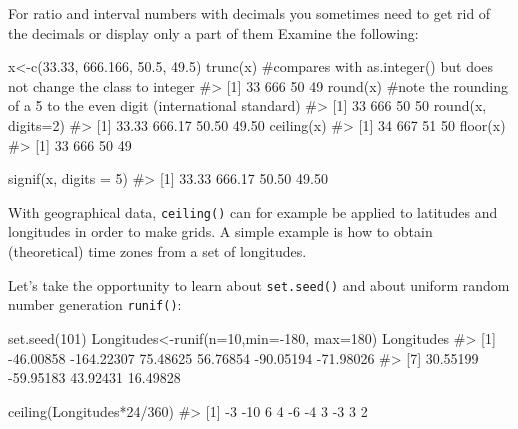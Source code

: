 \documentclass[
  letterpaper,
  DIV=11,
  numbers=noendperiod]{scrreprt}
\newenvironment{Shaded}{\begin{snugshade}}{\end{snugshade}}
\newcommand{\AttributeTok}[1]{\textcolor[rgb]{0.40,0.45,0.13}{#1}}
\newcommand{\CommentTok}[1]{\textcolor[rgb]{0.37,0.37,0.37}{#1}}
\newcommand{\DecValTok}[1]{\textcolor[rgb]{0.68,0.00,0.00}{#1}}
\newcommand{\FloatTok}[1]{\textcolor[rgb]{0.68,0.00,0.00}{#1}}
\newcommand{\FunctionTok}[1]{\textcolor[rgb]{0.28,0.35,0.67}{#1}}
\newcommand{\NormalTok}[1]{\textcolor[rgb]{0.00,0.23,0.31}{#1}}
\newcommand{\OtherTok}[1]{\textcolor[rgb]{0.00,0.23,0.31}{#1}}
\newcommand{\SpecialCharTok}[1]{\textcolor[rgb]{0.37,0.37,0.37}{#1}}
\begin{document}
For ratio and interval numbers with decimals you sometimes need to get
rid of the decimals or display only a part of them Examine the
following:

\begin{Shaded}
\begin{Highlighting}[]
\NormalTok{x}\OtherTok{\textless{}{-}}\FunctionTok{c}\NormalTok{(}\FloatTok{33.33}\NormalTok{, }\FloatTok{666.166}\NormalTok{, }\FloatTok{50.5}\NormalTok{, }\FloatTok{49.5}\NormalTok{)}
\FunctionTok{trunc}\NormalTok{(x) }\CommentTok{\#compares with as.integer() but does not change the class to integer}
\CommentTok{\#\textgreater{} [1]  33 666  50  49}
\FunctionTok{round}\NormalTok{(x) }\CommentTok{\#note the rounding of a 5 to the even digit (international standard) }
\CommentTok{\#\textgreater{} [1]  33 666  50  50}
\FunctionTok{round}\NormalTok{(x, }\AttributeTok{digits=}\DecValTok{2}\NormalTok{)}
\CommentTok{\#\textgreater{} [1]  33.33 666.17  50.50  49.50}
\FunctionTok{ceiling}\NormalTok{(x)}
\CommentTok{\#\textgreater{} [1]  34 667  51  50}
\FunctionTok{floor}\NormalTok{(x)}
\CommentTok{\#\textgreater{} [1]  33 666  50  49}

\FunctionTok{signif}\NormalTok{(x, }\AttributeTok{digits =} \DecValTok{5}\NormalTok{)}
\CommentTok{\#\textgreater{} [1]  33.33 666.17  50.50  49.50}
\end{Highlighting}
\end{Shaded}

With geographical data, \texttt{ceiling()} can for example be applied to
latitudes and longitudes in order to make grids. A simple example is how
to obtain (theoretical) time zones from a set of longitudes.

Let's take the opportunity to learn about \texttt{set.seed()} and about
uniform random number generation \texttt{runif()}:

\begin{Shaded}
\begin{Highlighting}[]
\FunctionTok{set.seed}\NormalTok{(}\DecValTok{101}\NormalTok{)}
\NormalTok{Longitudes}\OtherTok{\textless{}{-}}\FunctionTok{runif}\NormalTok{(}\AttributeTok{n=}\DecValTok{10}\NormalTok{,}\AttributeTok{min=}\SpecialCharTok{{-}}\DecValTok{180}\NormalTok{, }\AttributeTok{max=}\DecValTok{180}\NormalTok{)}
\NormalTok{Longitudes}
\CommentTok{\#\textgreater{}  [1]  {-}46.00858 {-}164.22307   75.48625   56.76854  {-}90.05194  {-}71.98026}
\CommentTok{\#\textgreater{}  [7]   30.55199  {-}59.95183   43.92431   16.49828}

\FunctionTok{ceiling}\NormalTok{(Longitudes}\SpecialCharTok{*}\DecValTok{24}\SpecialCharTok{/}\DecValTok{360}\NormalTok{)}
\CommentTok{\#\textgreater{}  [1]  {-}3 {-}10   6   4  {-}6  {-}4   3  {-}3   3   2}
\end{Highlighting}
\end{Shaded}
\end{document}
